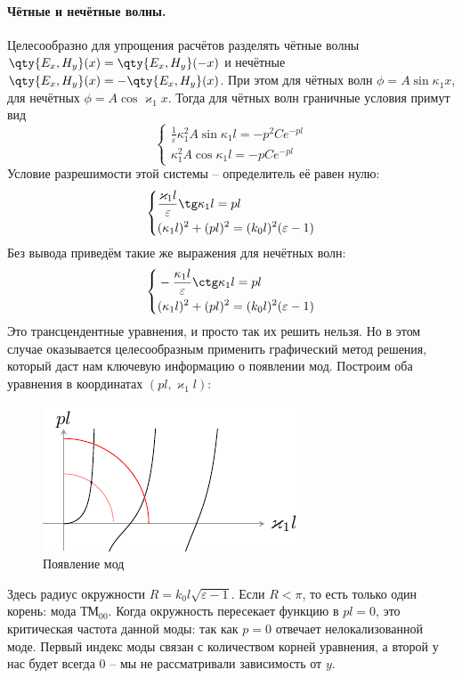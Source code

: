 \paragraph{Чётные и нечётные волны. } Целесообразно для упрощения расчётов разделять чётные волны $\qty{E_x,H_y}(x)=\qty{E_x,H_y}(-x)$ и нечётные $\qty{E_x,H_y}(x)=-\qty{E_x,H_y}(x)$. При этом для чётных волн $\phi=A\sin\kappa_1 x$, для нечётных $\phi=A\cos \varkappa_1 x$. Тогда для чётных волн граничные условия примут вид
\begin{equation}
    \left\{\begin{aligned}
            \frac{1}{\varepsilon}\kappa_1^2 A\sin\kappa_1 l = -p^2 C e^{-pl}\\
            \kappa_1^2 A \cos \kappa_1 l = -p C e^{-pl} 
    \end{aligned}\right.
\end{equation}
Условие разрешимости этой системы -- определитель её равен нулю:
\begin{equation}
    \left\{\begin{aligned}
            &\frac{\varkappa_1 l}{\varepsilon} \tg \kappa_1 l = pl\\
            &(\kappa_1 l)^2 +  (pl)^2 = (k_0 l)^2 (\varepsilon-1)
    \end{aligned}\right.
\end{equation}
Без вывода приведём такие же выражения для нечётных волн:
\begin{equation}
    \left\{\begin{aligned}
        &-\frac{\kappa_1 l}{\varepsilon} \ctg \kappa_1 l = pl\\
        &(\kappa_1 l)^2 +  (pl)^2 = (k_0 l)^2 (\varepsilon-1)
    \end{aligned}\right.
\end{equation}
Это трансцендентные уравнения, и просто так их решить нельзя. Но в этом случае оказывается целесообразным применить графический метод решения, который даст нам ключевую информацию о появлении мод. Построим оба уравнения в координатах $(pl, \varkappa_1 l)$:
\begin{figure}[H]
    \centering
    \includegraphics[scale=1.5]{img3/1}
    \caption{Появление мод}
    \label{fig:}
\end{figure}
Здесь радиус окружности $R=k_0 l \sqrt{\varepsilon-1}$. Если $R<\pi$, то есть только один корень: мода ТМ${}_{00}$. Когда окружность пересекает функцию в $pl=0$, это критическая частота данной моды: так как $p=0$ отвечает нелокализованной моде. Первый индекс моды связан с количеством корней уравнения, а второй у нас будет всегда 0 -- мы не рассматривали зависимость от $y$.
